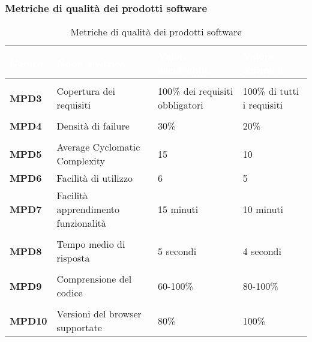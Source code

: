 \newpage
\subsubsection{Metriche di qualità dei prodotti software}
\renewcommand{\arraystretch}{1.5}
\begin{longtable}{C{2.5cm} C{5.5cm} C{3.5cm} C{3.5cm}}
\textcolor{white}{\textbf{Codice}}&
\textcolor{white}{\textbf{Nome metrica}}&
\textcolor{white}{\textbf{Valore accettabile}}&
\textcolor{white}{\textbf{Valore ottimale}}\\
\hline
{}
 \\	
\endhead
\endfoot
{}\caption{Metriche di qualità dei prodotti software}
\endlastfoot
	\textbf{MPD3} & Copertura dei requisiti & 100\% dei requisiti obbligatori & 100\% di tutti i requisiti \\
 \\			
	\textbf{MPD4} & Densità di failure & 30\% & 20\% \\
 \\
	\textbf{MPD5} & Average Cyclomatic Complexity & 15 & 10 \\		
	\textbf{MPD6} & Facilità di utilizzo & 6 & 5 \\
	\textbf{MPD7} & Facilità apprendimento funzionalità & 15 minuti & 10 minuti\\
 \\
 	\textbf{MPD8} & Tempo medio di risposta & 5 secondi & 4 secondi \\
 \\ 	
 	\textbf{MPD9} & Comprensione del codice & 60-100\% & 80-100\% \\
 \\ 
	\textbf{MPD10} & Versioni del browser supportate & 80\% & 100\% \\
\end{longtable}